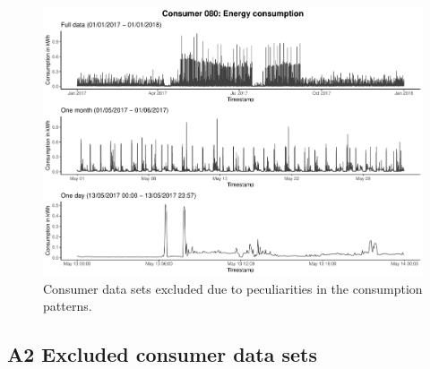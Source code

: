 \begin{centering}
\begin{figure}[!htbp]
        \includegraphics[width=\textwidth-0.85cm]{thesis/graphs/timeseries/c080_cons.pdf}
        \caption[Consumer data sets excluded due to peculiarities in the consumption patterns]{Consumer data sets excluded due to peculiarities in the consumption patterns. \quantnet}
        \label{App:Fig:excludedcons}
\end{figure}
\end{centering}


\subsection*{A2 Excluded consumer data sets}\label{App:Figures:Excludedp}

